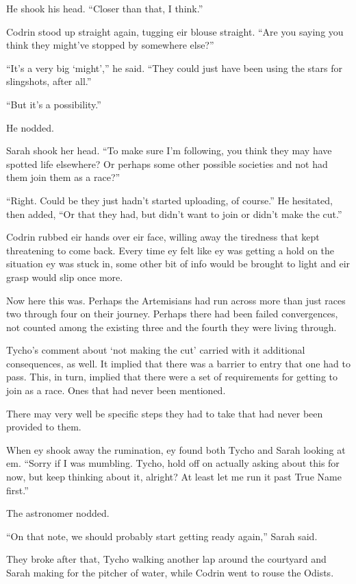 He shook his head. ``Closer than that, I think.''

Codrin stood up straight again, tugging eir blouse straight. ``Are you saying you think they might've stopped by somewhere else?''

``It's a very big `might','' he said. ``They could just have been using the stars for slingshots, after all.''

``But it's a possibility.''

He nodded.

Sarah shook her head. ``To make sure I'm following, you think they may have spotted life elsewhere? Or perhaps some other possible societies and not had them join them as a race?''

``Right. Could be they just hadn't started uploading, of course.'' He hesitated, then added, ``Or that they had, but didn't want to join or didn't make the cut.''

Codrin rubbed eir hands over eir face, willing away the tiredness that kept threatening to come back. Every time ey felt like ey was getting a hold on the situation ey was stuck in, some other bit of info would be brought to light and eir grasp would slip once more.

Now here this was. Perhaps the Artemisians had run across more than just races two through four on their journey. Perhaps there had been failed convergences, not counted among the existing three and the fourth they were living through.

Tycho's comment about `not making the cut' carried with it additional consequences, as well. It implied that there was a barrier to entry that one had to pass. This, in turn, implied that there were a set of requirements for getting to join as a race. Ones that had never been mentioned.

There may very well be specific steps they had to take that had never been provided to them.

When ey shook away the rumination, ey found both Tycho and Sarah looking at em. ``Sorry if I was mumbling. Tycho, hold off on actually asking about this for now, but keep thinking about it, alright? At least let me run it past True Name first.''

The astronomer nodded.

``On that note, we should probably start getting ready again,'' Sarah said.

They broke after that, Tycho walking another lap around the courtyard and Sarah making for the pitcher of water, while Codrin went to rouse the Odists.

